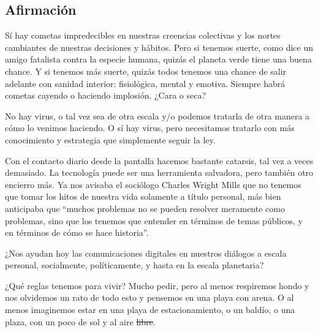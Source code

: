 \subsection{Afirmación}
Sí hay cometas impredecibles en nuestras creencias colectivas y los
nortes cambiantes de nuestras decisiones y hábitos. Pero si tenemos
suerte, como dice un amigo fatalista contra la especie humana, quizás el
planeta verde tiene una buena chance. Y si tenemos más suerte, quizás
todos tenemos una chance de salir adelante con sanidad interior:
fisiológica, mental y emotiva. 
Siempre habrá cometas cayendo o haciendo implosión. ¿Cara o seca?




No hay virus, o tal vez sea de otra escala y/o podemos
tratarla de otra manera a cómo lo venimos haciendo. O sí hay virus, pero
necesitamos tratarlo con más conocimiento y estrategia que simplemente
seguir la ley. 

Con el contacto diario desde la pantalla hacemos bastante catarsis, tal vez a veces demasiado.
La tecnología puede ser una herramienta salvadora, pero también otro encierro más. 
Ya nos avisaba el sociólogo Charles Wright Mills que no tenemos que tomar los hitos de nuestra vida solamente a título personal, 
más bien anticipaba que ``muchos problemas no se pueden resolver meramente como problemas,
sino que los tenemos que entender en términos de temas públicos, y en términos de cómo se hace historia''.

¿Nos ayudan hoy las comunicaciones digitales en nuestros diálogos a escala personal, 
socialmente, políticamente, y hasta en la escala planetaria?

¿Qué reglas tenemos para vivir? Mucho pedir, pero al
menos respiremos hondo y nos olvidemos un rato de todo esto y pensemos
en una playa con arena. O al menos imaginemos estar en una playa de
estacionamiento, o un baldío, o una plaza, con un poco de sol y al aire\sout{ libre}.

